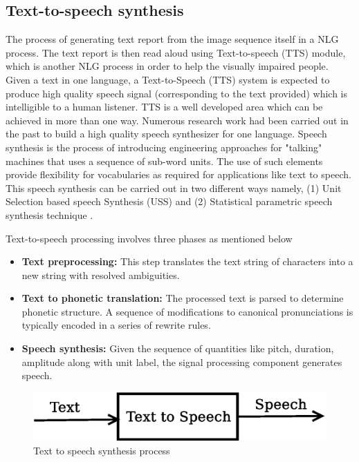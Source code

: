 \documentclass{article}
\begin{document}
\subsection{Text-to-speech synthesis}
\label{sec:tts}
The process of generating text report from the image sequence itself in a NLG process. 
The text report is then read aloud using Text-to-speech (TTS) module, which is another 
NLG process in order to help the visually impaired people. Given a text in one language, 
a Text-to-Speech (TTS) system is expected to produce high quality speech signal
(corresponding to the text provided) which is intelligible to a human listener. TTS
is a well developed area which can be achieved in more than one way. Numerous research 
work had been carried out in the past to build a high quality speech synthesizer 
for one language. Speech synthesis is the process of introducing engineering approaches 
for "talking" machines that uses a sequence of sub-word units. The use of such elements
provide flexibility for vocabularies as required for applications like text to speech. This speech synthesis can be carried out in two different ways namely, (1) Unit Selection based speech Synthesis (USS) \cite{uss} and (2) Statistical parametric speech synthesis technique \cite{zenStatistical}.

Text-to-speech processing involves three phases as mentioned below
\begin{itemize}
\item {\bf Text preprocessing:} This step translates the text string of characters into
a new string with resolved ambiguities.
\item {\bf Text to phonetic translation:} The processed text is parsed to determine
phonetic structure. A sequence of modifications to canonical pronunciations is typically
encoded in a series of rewrite rules.
\item {\bf Speech synthesis:} Given the sequence of quantities like pitch, duration, amplitude along with unit label, the signal processing component generates speech.
\end{itemize}

\begin{figure}[h]
\centering
\includegraphics[scale=0.35]{figures/tts.eps}
\caption{Text to speech synthesis process}
\label{fig:ttsBlock}
\end{figure}
\end{document}
